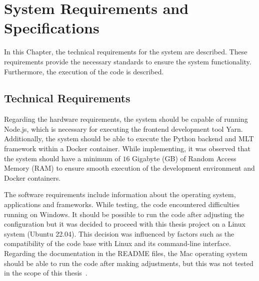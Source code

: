 \documentclass[../MasterThesis.tex]{subfiles}
\begin{document}
	
	
	

%
%
%
%
%
%
%
%
\newpage
\section{System Requirements and Specifications} \label{section:systemrequirementsandspecifications}




In this Chapter, the technical requirements for the system are described. These requirements provide the necessary standards to ensure the system functionality. Furthermore, the execution of the code is described.




\subsection{Technical Requirements} \label{subsection:technicalrequirements}



Regarding the hardware requirements, the system should be capable of running Node.js, which is necessary for executing the frontend development tool Yarn. Additionally, the system should be able to execute the Python backend and MLT framework within a Docker container.
While implementing, it was observed that the system should have a minimum of $16$ Gigabyte (GB) of Random Access Memory (RAM) to ensure smooth execution of the development environment and Docker containers.



The software requirements include information about the operating system, applications and frameworks.
While testing, the code encountered difficulties running on Windows. It should be possible to run the code after adjusting the configuration but it was decided to proceed with this thesis project on a Linux system (Ubuntu 22.04). This decision was influenced by factors such as the compatibility of the code base with Linux and its command-line interface.
Regarding the documentation in the README files, the Mac operating system should be able to run the code after making adjustments, but this was not tested in the scope of this thesis~\cite{RM_Backend}.
\end{document}
